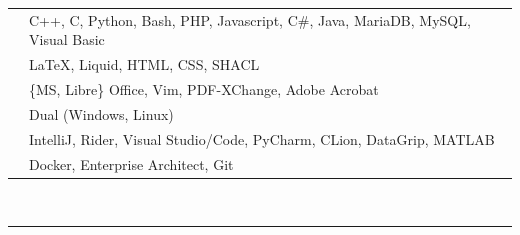 \documentclass[onside]{article}
\newcommand{\betiny}{\fontsize{6pt}{7pt}\selectfont}
\begin{document}
{\begin{minipage}[t][\textheight-2\fboxsep-2\fboxrule][t]{\dimexpr0.40\textwidth-2\fboxrule-2\fboxsep\relax}
        \begin{tabularx}{\textwidth}{cY}
            \faCode{}        & C++, C, Python, Bash, PHP, Javascript, C\#, Java, MariaDB, MySQL, Visual Basic \\
            \faPen*{}        & \LaTeX, Liquid, HTML, CSS, SHACL \\
            \faFont{}        & \{MS, Libre\} Office, Vim, PDF-XChange,  Adobe Acrobat \\
            \faCogs{}        & Dual (Windows, Linux) \\
            \faLaptopCode{}  & IntelliJ, Rider, Visual Studio/Code, PyCharm,  CLion, DataGrip, MATLAB\\
            \faToolbox{}     & Docker, Enterprise Architect, Git
        \end{tabularx}
        \vspace{1pt} \\
        \rule{\linewidth}{0.4pt}
        \vfill
%
%
\end{minipage}}
\end{document}
